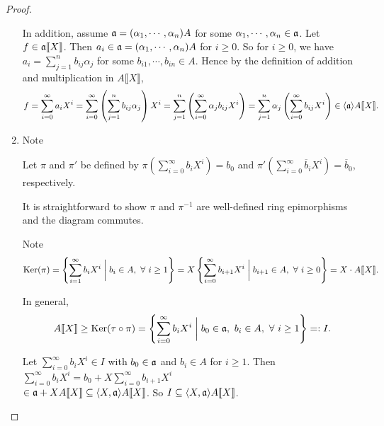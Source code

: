 \begin{proof}
\begin{enumerate}
            In addition, assume $\mathfrak{a} = (\alpha_1,\cdots,\alpha_n)A$ for some $\alpha_1,\cdots,\alpha_n \in \mathfrak{a}$. Let $f \in \mathfrak{a} \llbracket X \rrbracket$. Then $a_i \in \mathfrak{a} = (\alpha_1,\cdots,\alpha_n)A$ for $i \geq 0$. So for $i \geq 0$, we have $a_i = \sum_{j=1}^n b_{ij}\alpha_j$ for some $b_{i1},\cdots,b_{in} \in A$. Hence by the definition of addition and multiplication in $A\llbracket X \rrbracket$, 
            \[f = \sum_{i=0}^\infty a_iX^i = \sum_{i=0}^\infty \left(\sum_{j=1}^n b_{ij}\alpha_j\right)X^i = \sum_{j=1}^n \left(\sum_{i=0}^\infty \alpha_jb_{ij}X^i\right) = \sum_{j=1}^n \alpha_j \left(\sum_{i=0}^\infty b_{ij}X^i\right) \in \langle \mathfrak{a} \rangle A\llbracket X \rrbracket.\]
        \item 
            Note
            \begin{center}
            \end{center}
            \par Let $\pi$ and $\pi'$ be defined by $\pi(\sum_{i=0}^\infty b_iX^i) = b_0$ and $\pi'(\sum_{i=0}^\infty \overbar b_iX^i) = \overline b_0$, respectively. \par 
            It is straightforward to show $\pi$ and $\pi^{-1}$ are well-defined ring epimorphisms and the diagram commutes. \par 
            Note 
            \[\operatorname{Ker}(\pi) = \left\{\sum_{i=1}^\infty b_iX^i \mathrel{\bigg |} b_i \in A, \ \forall \  i \geq 1\right\} = X\left\{\sum_{i=0}^\infty b_{i+1}X^i \mathrel{\bigg |} b_{i+1} \in A, \ \forall \  i \geq 0\right\} = X \cdot A \llbracket X \rrbracket.\]
            \par In general, 
            \[A\llbracket X \rrbracket \geq \operatorname{Ker}(\tau \circ \pi) = \left\{\sum_{i=0}^\infty b_iX^i \mathrel{\bigg |} b_0 \in \mathfrak{a},\ b_i \in A, \ \forall \  i \geq 1\right\} =: I.\]
            \par Let $\sum_{i=0}^\infty b_i X^i \in I$ with $b_0 \in \mathfrak{a}$ and $b_i \in A$ for $i \geq 1$. Then $\sum_{i=0}^\infty b_iX^i = b_0 + X \sum_{i=0}^\infty b_{i+1}X^i$ \\
            $\in \mathfrak{a} + X A\llbracket X \rrbracket \subseteq \langle X,\mathfrak{a} \rangle A\llbracket X \rrbracket$. So $I \subseteq \langle X,\mathfrak{a} \rangle A\llbracket X \rrbracket$. \par 

\end{enumerate}
\end{proof}
